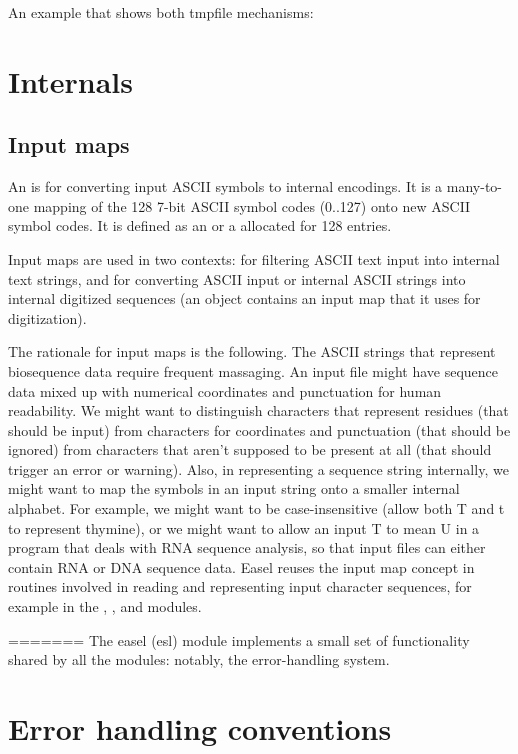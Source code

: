 An example that shows both tmpfile mechanisms:



\section{Internals}

\subsection{Input maps}

An  is for converting input ASCII symbols to
internal encodings. It is a many-to-one mapping of the 128 7-bit ASCII
symbol codes (0..127) onto new ASCII symbol codes. It is defined as
an  or a 
allocated for 128 entries.

Input maps are used in two contexts: for filtering ASCII text input
into internal text strings, and for converting ASCII input or internal
ASCII strings into internal digitized sequences (an 
object contains an input map that it uses for digitization).

The rationale for input maps is the following. The ASCII strings that
represent biosequence data require frequent massaging. An input file
might have sequence data mixed up with numerical coordinates and
punctuation for human readability. We might want to distinguish
characters that represent residues (that should be input) from
characters for coordinates and punctuation (that should be ignored)
from characters that aren't supposed to be present at all (that should
trigger an error or warning). Also, in representing a sequence string
internally, we might want to map the symbols in an input string onto a
smaller internal alphabet. For example, we might want to be
case-insensitive (allow both T and t to represent thymine), or we
might want to allow an input T to mean U in a program that deals with
RNA sequence analysis, so that input files can either contain RNA or
DNA sequence data.  Easel reuses the input map concept in routines
involved in reading and representing input character sequences, for
example in the , , and 
modules.

=======
The easel (esl) module implements a small set of functionality shared
by all the modules: notably, the error-handling system.

\section{Error handling conventions}

